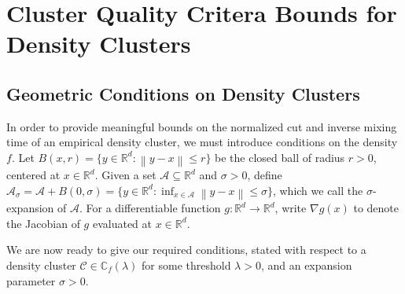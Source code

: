 \documentclass{article}
\newcommand{\Reals}{\mathbb{R}}
\newcommand{\Rd}{\Reals^d}
\newcommand{\norm}[1]{\left\lVert#1\right\rVert}
\newcommand{\1}{\mathbf{1}}
\newcommand{\Cbb}{\mathbb{C}}
\newcommand{\Cset}{\mathcal{C}}
\newcommand{\Aset}{\mathcal{A}}
\newcommand{\Asig}{\Aset_{\sigma}}
\theoremstyle{aldenthm}
\theoremstyle{aldenrmrk}
\begin{document}
\section{Cluster Quality Critera Bounds for Density Clusters}  
\label{sec: cluster_quality_bounds}

\subsection{Geometric Conditions on Density Clusters}

In order to provide meaningful bounds on the normalized cut and inverse mixing
time of an empirical density cluster, we must introduce conditions on the
density $f$. Let $B(x,r) = \{y \in \Rd: \norm{y - x} \leq r\}$ be the closed
ball of radius $r > 0$, centered at $x \in \Rd$.  Given a set $\Aset
\subseteq \Rd$ and $\sigma > 0$, define $\Asig = \Aset + B(0,\sigma) = \{y \in
\Rd: \inf_{x \in \Aset} \norm{y - x} \leq \sigma\}$, which we call the
$\sigma$-expansion of $\Aset$. For a differentiable function $g: \Rd \to \Rd$, write $\nabla g(x)$ to denote the Jacobian of $g$ evaluated at $x \in \Rd$. 

We are now ready to give our required conditions, stated with respect to a density
cluster $\Cset \in \Cbb_f(\lambda)$ for some threshold $\lambda > 0$, and an
expansion parameter $\sigma > 0$. 
\end{document}
